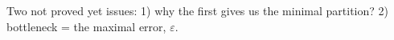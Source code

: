 \documentclass[review]{elsarticle}
\DeclareMathOperator{\support}{support}
\begin{document}
%
%     


Two not proved yet issues:
1) why the first gives us the minimal partition? 2) bottleneck  = the maximal error, $\varepsilon$.
\end{document}
